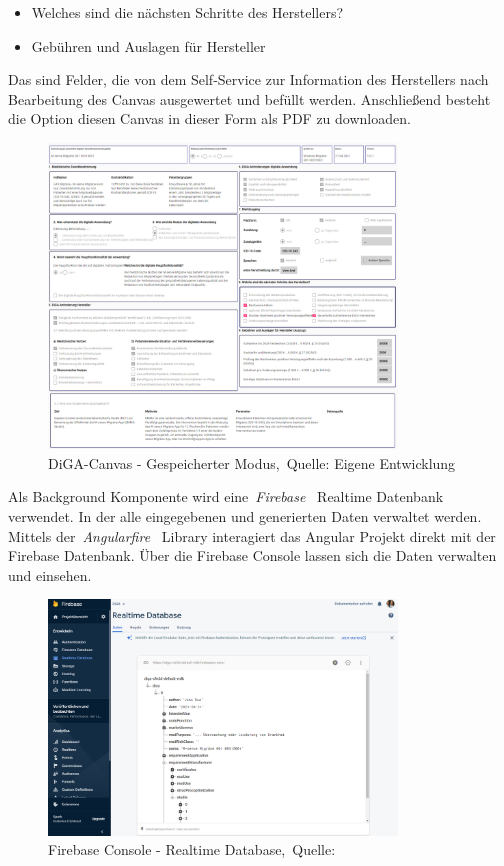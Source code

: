 \begin{itemize}
	\item Welches sind die nächsten Schritte des Herstellers?
	\item Gebühren und Auslagen für Hersteller
\end{itemize}
 Das sind Felder, die von dem Self-Service zur Information des Herstellers nach Bearbeitung des Canvas ausgewertet und befüllt werden. Anschließend besteht die Option diesen Canvas in dieser Form als PDF zu downloaden.
  \begin{figure}[H]
  	\centering
  	\includegraphics[width=350px, keepaspectratio]{assets/onSave.png}
  	\caption[DiGA-Canvas - Gespeicherter Modus]{DiGA-Canvas - Gespeicherter Modus,~Quelle: Eigene Entwicklung}
  	\label{fig:canvasonsave}
  \end{figure}
Als Background Komponente wird eine~\textit{Firebase}~\cite{firebase} Realtime Datenbank verwendet. In der alle eingegebenen und generierten Daten verwaltet werden. Mittels der~\textit{Angularfire}~\cite{angularfire} Library interagiert das Angular Projekt direkt mit der Firebase Datenbank. Über die Firebase Console lassen sich die Daten verwalten und einsehen.
  
    \begin{figure}[H]
  	\centering
  	\includegraphics[width=350px, keepaspectratio]{assets/firebaseConsole.png}
  	\caption[Firebase Console - Realtime Database]{Firebase Console - Realtime Database,~Quelle:~\cite{firebase}}
  \end{figure}